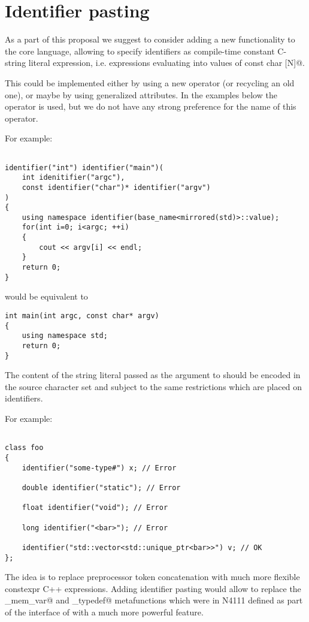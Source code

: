 \section{Identifier pasting}

As a part of this proposal we suggest to consider adding a new functionality to the core language,
allowing to specify identifiers as compile-time constant C-string literal expression, i.e. expressions
evaluating into values of \verb@constexpr const char [N]@.

This could be implemented either by using a new operator (or recycling an old one),
or maybe by using generalized attributes.
In the examples below the \verb@identifier@ operator is used, but we do not have
any strong preference for the name of this operator.

For example:

\begin{verbatim}

identifier("int") identifier("main")(
	int idenitifier("argc"),
	const identifier("char")* identifier("argv")
)
{
	using namespace identifier(base_name<mirrored(std)>::value);
	for(int i=0; i<argc; ++i)
	{
		cout << argv[i] << endl;
	}
	return 0;
}

\end{verbatim}

would be equivalent to

\begin{verbatim}
int main(int argc, const char* argv)
{
	using namespace std;
	return 0;
}
\end{verbatim}

The content of the string literal passed as the argument to \verb@identifier@
should be encoded in the source character set and subject to the same restrictions
which are placed on identifiers.

For example:

\begin{verbatim}

class foo
{
	identifier("some-type#") x; // Error

	double identifier("static"); // Error

	float identifier("void"); // Error

	long identifier("<bar>"); // Error

	identifier("std::vector<std::unique_ptr<bar>>") v; // OK
};

\end{verbatim}

The idea is to replace preprocessor token concatenation with much more
flexible constexpr C++ expressions.
Adding identifier pasting would allow to replace the \verb@named_mem_var@
and \verb@named_typedef@ metafunctions which were in N4111 defined as part of
the interface of  with a much more powerful feature.

